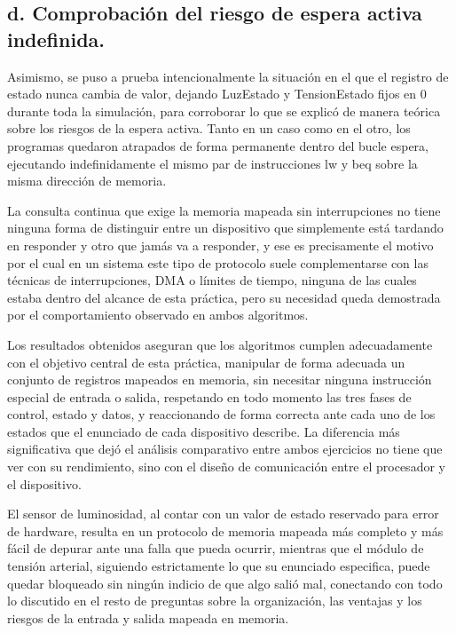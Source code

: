 \documentclass[12pt, letterpaper]{article}
\begin{document}
\subsection*{d. Comprobación del riesgo de espera activa indefinida.}

Asimismo, se puso a prueba intencionalmente la situación en el que el registro de estado nunca cambia de valor, dejando LuzEstado y TensionEstado fijos en 0 durante toda la simulación, para corroborar lo que se explicó de manera teórica sobre los riesgos de la espera activa. Tanto en un caso como en el otro, los programas quedaron atrapados de forma permanente dentro del bucle espera, ejecutando indefinidamente el mismo par de instrucciones lw y beq sobre la misma dirección de memoria.

La consulta continua que exige la memoria mapeada sin interrupciones no tiene ninguna forma de distinguir entre un dispositivo que simplemente está tardando en responder y otro que jamás va a responder, y ese es precisamente el motivo por el cual en un sistema este tipo de protocolo suele complementarse con las técnicas de interrupciones, DMA o límites de tiempo, ninguna de las cuales estaba dentro del alcance de esta práctica, pero su necesidad queda demostrada por el comportamiento observado en ambos algoritmos.

Los resultados obtenidos aseguran que los algoritmos cumplen adecuadamente con el objetivo central de esta práctica, manipular de forma adecuada un conjunto de registros mapeados en memoria, sin necesitar ninguna instrucción especial de entrada o salida, respetando en todo momento las tres fases de control, estado y datos, y reaccionando de forma correcta ante cada uno de los estados que el enunciado de cada dispositivo describe. La diferencia más significativa que dejó el análisis comparativo entre ambos ejercicios no tiene que ver con su rendimiento, sino con el diseño de comunicación entre el procesador y el dispositivo.

El sensor de luminosidad, al contar con un valor de estado reservado para error de hardware, resulta en un protocolo de memoria mapeada más completo y más fácil de depurar ante una falla que pueda ocurrir, mientras que el módulo de tensión arterial, siguiendo estrictamente lo que su enunciado especifica, puede quedar bloqueado sin ningún indicio de que algo salió mal, conectando con todo lo discutido en el resto de preguntas sobre la organización, las ventajas y los riesgos de la entrada y salida mapeada en memoria.
\end{document}
